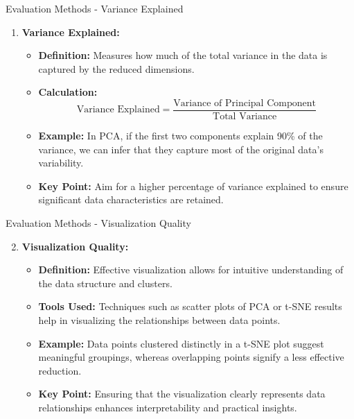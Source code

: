 \documentclass[aspectratio=169]{beamer}
\begin{document}
\begin{frame}{Evaluation Methods - Variance Explained}
  \begin{enumerate}
    \item \textbf{Variance Explained:}
      \begin{itemize}
        \item \textbf{Definition:} Measures how much of the total variance in the data is captured by the reduced dimensions.
        \item \textbf{Calculation:}
          \begin{equation}
          \text{Variance Explained} = \frac{\text{Variance of Principal Component}}{\text{Total Variance}}
          \end{equation}
        \item \textbf{Example:} In PCA, if the first two components explain 90\% of the variance, we can infer that they capture most of the original data’s variability.
        \item \textbf{Key Point:} Aim for a higher percentage of variance explained to ensure significant data characteristics are retained.
      \end{itemize}
  \end{enumerate}
\end{frame}

\begin{frame}{Evaluation Methods - Visualization Quality}
  \begin{enumerate}
    \setcounter{enumi}{1}
    \item \textbf{Visualization Quality:}
      \begin{itemize}
        \item \textbf{Definition:} Effective visualization allows for intuitive understanding of the data structure and clusters.
        \item \textbf{Tools Used:} Techniques such as scatter plots of PCA or t-SNE results help in visualizing the relationships between data points.
        \item \textbf{Example:} Data points clustered distinctly in a t-SNE plot suggest meaningful groupings, whereas overlapping points signify a less effective reduction.
        \item \textbf{Key Point:} Ensuring that the visualization clearly represents data relationships enhances interpretability and practical insights.
      \end{itemize}
  \end{enumerate}
\end{frame}
\end{document}
